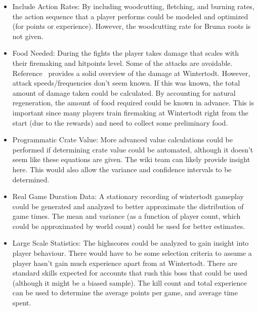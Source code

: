 		\begin{itemize}
			\item Include Action Rates: By including woodcutting, fletching, and burning rates, the action sequence that a player performs could be modeled and optimized (for points or experience). However, the woodcutting rate for Bruma roots is not given.

			\item Food Needed: During the fights the player takes damage that scales with their firemaking and hitpoints level. Some of the attacks are avoidable. Reference~\cite{osrsbox:wintertodt_damage} provides a solid overview of the damage at Wintertodt. However, attack speeds/frequencies don't seem known. If this was known, the total amount of damage taken could be calculated. By accounting for natural regeneration, the amount of food required could be known in advance. This is important since many players train firemaking at Wintertodt right from the start (due to the rewards) and need to collect some preliminary food.

			\item Programmatic Crate Value: More advanced value calculations could be performed if determining crate value could be automated, although it doesn't seem like these equations are given. The wiki team can likely provide insight here. This would also allow the variance and confidence intervals to be determined.

			\item Real Game Duration Data: A stationary recording of wintertodt gameplay could be generated and analyzed to better approximate the distribution of game times. The mean and variance (as a function of player count, which could be approximated by world count) could be used for better estimates.

			\item Large Scale Statistics: The highscores could be analyzed to gain insight into player behaviour. There would have to be some selection criteria to assume a player hasn't gain much experience apart from at Wintertodt. There are standard skills expected for accounts that rush this boss that could be used (although it might be a biased sample). The kill count and total experience can be used to determine the average points per game, and average time spent.

		\end{itemize}



